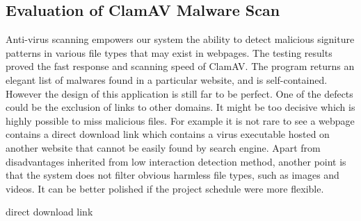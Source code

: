 \subsection{Evaluation of ClamAV Malware Scan}
Anti-virus scanning empowers our system the ability to detect malicious 
signiture patterns in various file types that may exist in webpages. The 
testing results proved the fast response and scanning speed of ClamAV. The 
program returns an elegant list of malwares found in a particular website, and 
is self-contained. \\
However the design of this application is still far to be perfect. One of the 
defects could be the exclusion of links to other domains. It might be too 
decisive which is highly possible to miss malicious files.  For example it is 
not rare to see a webpage contains a direct download link which contains a
virus executable hosted on another website that cannot be easily found by 
search engine. Apart from disadvantages inherited from low interaction 
detection method, another point is that the system does not filter obvious 
harmless file types, such as images and videos. It can be better polished if 
the project schedule were more flexible.  




direct download link 
